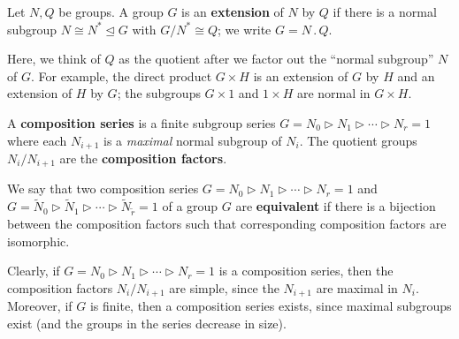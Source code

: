 \begin{definition}\label{def:group_extension}
    Let $N,Q$ be groups. A group $G$ is an \textbf{extension} of $N$ by $Q$ if there is a normal subgroup $N \cong N^* \unlhd G$ with $G/N^* \cong Q$; we write $G = N \mathrel{.} Q$. 
\end{definition}

Here, we think of $Q$ as the quotient after we factor out the ``normal subgroup'' $N$ of $G$. For example, the direct product $G \times H$ is an extension of $G$ by $H$ and an extension of $H$ by $G$; the subgroups $G \times 1$ and $1 \times H$ are normal in $G \times H$. 


\begin{definition}\label{def:composition_series}
    A \textbf{composition series} is a finite subgroup series $G = N_0 \rhd N_1 \rhd \dotsb \rhd N_r = 1$ where each $N_{i+1}$ is a \textit{maximal} normal subgroup of $N_i$. The quotient groups $N_i/N_{i+1}$ are the \textbf{composition factors}.

    We say that two composition series $G = N_0 \rhd N_1 \rhd \dotsb \rhd N_r = 1$ and $G = \tilde N_0 \rhd \tilde N_1 \rhd \dotsb \rhd \tilde N_{\tilde r} = 1$ of a group $G$ are \textbf{equivalent} if there is a bijection between the  composition factors such that corresponding composition factors are isomorphic.
\end{definition}

Clearly, if $G = N_0 \rhd N_1 \rhd \dotsb \rhd N_r = 1$ is a composition series, then the composition factors $N_i/N_{i+1}$ are simple, since the $N_{i+1}$ are maximal in $N_i$. Moreover, if $G$ is finite, then a composition series exists, since maximal subgroups exist (and the groups in the series decrease in size).


